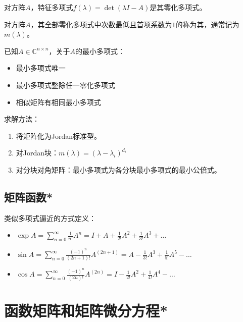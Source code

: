 \begin{theorem}
    对方阵$A$，特征多项式$f(\lambda)=\det{(\lambda I - A)}$是其零化多项式。
\end{theorem}

\begin{definition}[最小多项式]
    对方阵$A$，其全部零化多项式中次数最低且首项系数为$1$的称为其，通常记为$m(\lambda)$。
\end{definition}

\begin{property}
    已知$A\in \mathbb{C}^{n\times n}$，关于$A$的最小多项式：
    \begin{itemize}
        \item 最小多项式唯一
        \item 最小多项式整除任一零化多项式
        \item 相似矩阵有相同最小多项式
    \end{itemize}
\end{property}

求解方法：
\begin{enumerate}
    \item 将矩阵化为Jordan标准型。
    \item 对Jordan块：$m(\lambda) = (\lambda - \lambda_i)^{d_i}$
    \item 对分块对角矩阵：最小多项式为各分块最小多项式的最小公倍式。
\end{enumerate}

\subsection{矩阵函数*}

\begin{definition}
    类似多项式逼近的方式定义：
    \begin{itemize}
        \item $\exp A = \sum\limits_{n=0}^\infty \frac{1}{n!} A^n = I + A + \frac{1}{2!} A^2 + \frac{1}{3!} A^3 + \dots$
        \item $\sin A = \sum\limits_{n=0}^\infty \frac{(-1)^n}{(2n+1)!} A^(2n+1) = A - \frac{1}{3!} A^3 + \frac{1}{5!} A^5 - \dots$
        \item $\cos A = \sum\limits_{n=0}^\infty \frac{(-1)^n}{(2n)!} A^(2n) = I - \frac{1}{2!} A^2 + \frac{1}{4!} A^4 - \dots$
    \end{itemize}
\end{definition}

\section{函数矩阵和矩阵微分方程*}

